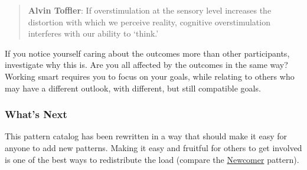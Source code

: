 \begin{quote}
\textbf{Alvin Toffler}: If overstimulation at the sensory level
increases the distortion with which we perceive reality, cognitive
overstimulation interferes with our ability to `think.'
\end{quote}

If you notice yourself caring about the outcomes more than other
participants, investigate why this is. Are you all affected by the
outcomes in the same way? Working smart requires you to focus on your
goals, while relating to others who may have a different outlook, with
different, but still compatible goals.

\subsubsection*{What's Next} This pattern catalog has been rewritten in a way
that should make it easy for anyone to add new patterns. Making it easy
and fruitful for others to get involved is one of the best ways to
redistribute the load (compare
the \href{http://peeragogy.org/practice/heuristics/newcomer/}{Newcomer}
pattern).


